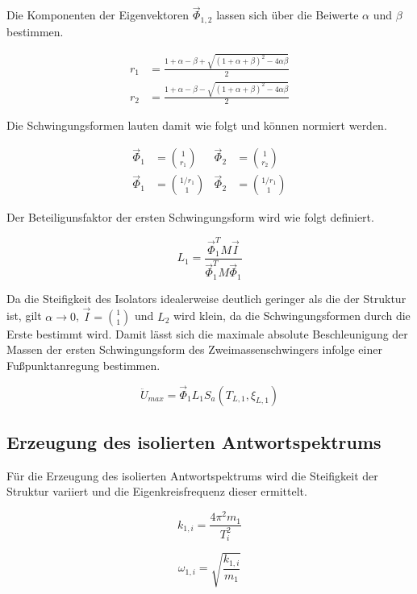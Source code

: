 Die Komponenten der Eigenvektoren $\vec{\Phi}_{1,2}$ lassen sich über die Beiwerte $\alpha$ und $\beta$ bestimmen.

\begin{align}
r_1 &= \frac{1 + \alpha - \beta + \sqrt{(1 + \alpha + \beta)^2 - 4 \alpha \beta}}{2}\\
r_2 &= \frac{1 + \alpha - \beta - \sqrt{(1 + \alpha + \beta)^2 - 4 \alpha \beta}}{2}
\end{align}

Die Schwingungsformen lauten damit wie folgt und können normiert werden.

\begin{align}
\vec{\Phi}_1 &= \binom{1}{r_1} & \vec{\Phi}_2 &= \binom{1}{r_2}\\
\vec{\Phi}_1 &= \binom{1/r_1}{1} & \vec{\Phi}_2 &= \binom{1/r_1}{1}
\end{align}

Der Beteiligunsfaktor der ersten Schwingungsform wird wie folgt definiert.

\begin{equation}
L_1 = \frac{\vec{\Phi}_1^T M \vec{I}}{\vec{\Phi}_1^T M \vec{\Phi}_1}
\end{equation}

Da die Steifigkeit des Isolators idealerweise deutlich geringer als die der Struktur ist, gilt $\alpha \rightarrow 0$, $\vec{I} = \binom{1}{1}$ und $L_2$ wird klein, da die Schwingungsformen durch die Erste bestimmt wird.
Damit lässt sich die maximale absolute Beschleunigung der Massen der ersten Schwingungsform des Zweimassenschwingers infolge einer Fußpunktanregung bestimmen.

\begin{equation}
\ddot U_{max} = \vec{\Phi}_1 L_1 S_a(T_{L,1}, \xi_{L,1})
\end{equation}

\subsection{Erzeugung des isolierten Antwortspektrums}
\label{sec:vereinfAWS}

Für die Erzeugung des isolierten Antwortspektrums wird die Steifigkeit der Struktur variiert und die Eigenkreisfrequenz dieser ermittelt.

\begin{equation}
k_{1,i} = \frac{4 \pi^2 m_1}{T_i^2}
\end{equation}

\begin{equation}
\omega_{1,i} = \sqrt{\frac{k_{1,i}}{m_1}}
\end{equation}

